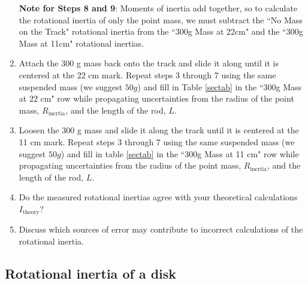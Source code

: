 \begin{enumerate}
 	\textbf{Note for Steps 8 and 9}: Moments of inertia add together, so to calculate the rotational inertia of only the point mass, we must subtract the ``No Mass on the Track" rotational inertia from the ``300g Mass at 22cm" and the ``300g Mass at 11cm" rotational inertias.
	\item Attach the 300 g mass back onto the track and slide it along until it is centered at the 22 cm mark.  Repeat steps 3 through 7 using the same suspended mass (we suggest $50g$) and fill in Table \ref{sectab} in the ``300g Mass at 22 cm" row while propagating uncertainties from the radius of the point mass, $R_{\text{inertia}}$, and the length of the rod, $L$.
	\item Loosen the 300 g mass and slide it along the track until it is centered at the 11 cm mark.  Repeat steps 3 through 7 using the same suspended mass (we suggest $50g$) and fill in table \ref{sectab} in the ``300g Mass at 11 cm" row while propagating uncertainties from the radius of the point mass, $R_{\text{inertia}}$, and the length of the rod, $L$.
	\item Do the measured rotational inertias agree with your theoretical calculations $I_\text{theory}$?
	\item Discuss which sources of error may contribute to incorrect calculations of the rotational inertia.
\end{enumerate}

\subsection{Rotational inertia of a disk}

